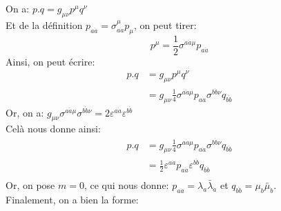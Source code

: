 \documentclass[12pt, a4paper]{article}
\begin{document}
	On a: \(p.q= g_{\mu\nu}p^{\mu}q^{\nu}\)\\
	Et de la définition \(p_{a \dot{a}}=\sigma_{a \dot{a}}^{\mu}p_{\mu}\), on peut tirer:
	\begin{equation}
		p^{\mu}=\frac{1}{2}\sigma^{a \dot{a}\mu}p_{a \dot{a}}
	\end{equation}
	Ainsi, on peut écrire: 
	\begin{equation}
		\begin{split}
			p.q
			&= g_{\mu\nu}p^{\mu}q^{\nu}\\
			&= g_{\mu\nu} \frac{1}{4}\sigma^{a \dot{a}\mu}p_{a \dot{a}}\sigma^{b \dot{b}\nu}q_{b \dot{b}}
		\end{split}
	\end{equation}
	Or, on a: \(g_{\mu\nu}\sigma^{a \dot{a}\mu}\sigma^{b \dot{b}\nu}= 2\varepsilon^{a \dot{a}}\varepsilon^{b \dot{b}}\)\\
	Celà nous donne ainsi: 
	\begin{equation}
		\begin{split}
			p.q
			&= g_{\mu\nu} \frac{1}{4}\sigma^{a \dot{a}\mu}p_{a \dot{a}}\sigma^{b \dot{b}\nu}q_{b \dot{b}}\\
			&=\frac{1}{2}\varepsilon^{a \dot{a}}p_{a \dot{a}}\varepsilon^{b \dot{b}}q_{b \dot{b}}\\
		\end{split}
	\end{equation}
	Or, on pose \(m=0\), ce qui nous donne: \(p_{a \dot{a}}=\lambda_a \bar{\lambda}_{\dot{a}}\) et \(q_{b \dot{b}}=\mu_b \bar{\mu}_{\dot{b}}\).\\
	Finalement, on a bien la forme:
	
	\begin{center}
	\end{center}
	
	
	
	
\end{document}
